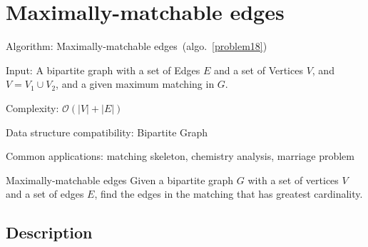 \documentclass{article}
\begin{document}
\fi

%
%

\def\pbname{Maximally-matchable edges} %

\section{\pbname} 

\begin{overview}
\item [Algorithm:] Maximally-matchable edges~(algo.~\ref{problem18}) 
\item [Input:] A bipartite graph with a set of Edges $E$ and a set of Vertices $V$, and $V=V_1 \cup V_2$, and a given maximum matching in $G$.
\item [Complexity:] $\mathcal{O}(|V|+ |E|)$
\item [Data structure compatibility:] Bipartite Graph
\item [Common applications:] matching skeleton, chemistry analysis, marriage problem
\end{overview}

\begin{problem}{\pbname}
	Given a bipartite graph $G$ with a set of vertices $V$ and a set of edges $E$, find the edges in the matching that has greatest cardinality. 
\end{problem}

\subsection*{Description}
\end{document}
